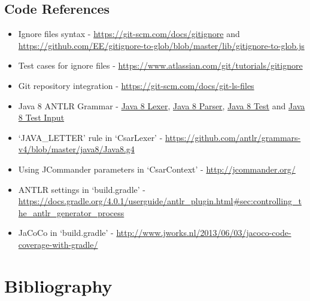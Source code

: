 \documentclass[12pt, letterpaper]{article}
\begin{document}
\subsection{Code References}
\begin{itemize}
  \item Ignore files syntax - \url{https://git-scm.com/docs/gitignore} and \url{https://github.com/EE/gitignore-to-glob/blob/master/lib/gitignore-to-glob.js}
  \item Test cases for ignore files - \url{https://www.atlassian.com/git/tutorials/gitignore}
  \item Git repository integration - \url{https://git-scm.com/docs/git-ls-files}
  \item Java 8 ANTLR Grammar - \href{https://github.com/antlr/grammars-v4/blob/02711067f82bed8e0c8dfd25e80f4f8ae2472abd/java8-pt/JavaLexer.g4}{Java 8 Lexer}, \href{https://github.com/antlr/grammars-v4/blob/02711067f82bed8e0c8dfd25e80f4f8ae2472abd/java8-pt/JavaParser.g4}{Java 8 Parser}, \href{https://github.com/antlr/grammars-v4/blob/02711067f82bed8e0c8dfd25e80f4f8ae2472abd/_grammar-test/src/test/java/TestJava8pt.java}{Java 8 Test} and \href{https://github.com/antlr/grammars-v4/blob/02711067f82bed8e0c8dfd25e80f4f8ae2472abd/java8-pt/examples/AllInOne8.java}{Java 8 Test Input}
  \item `JAVA\_LETTER' rule in `CsarLexer' - \url{https://github.com/antlr/grammars-v4/blob/master/java8/Java8.g4}
  \item Using JCommander parameters in `CsarContext' - \url{http://jcommander.org/}
  \item ANTLR settings in `build.gradle' - \url{https://docs.gradle.org/4.0.1/userguide/antlr\_plugin.html\#sec:controlling\_the\_antlr\_generator\_process}
  \item JaCoCo in `build.gradle' - \url{http://www.jworks.nl/2013/06/03/jacoco-code-coverage-with-gradle/}
\end{itemize}

\section{Bibliography}
\printbibliography[heading=none]
\end{document}
